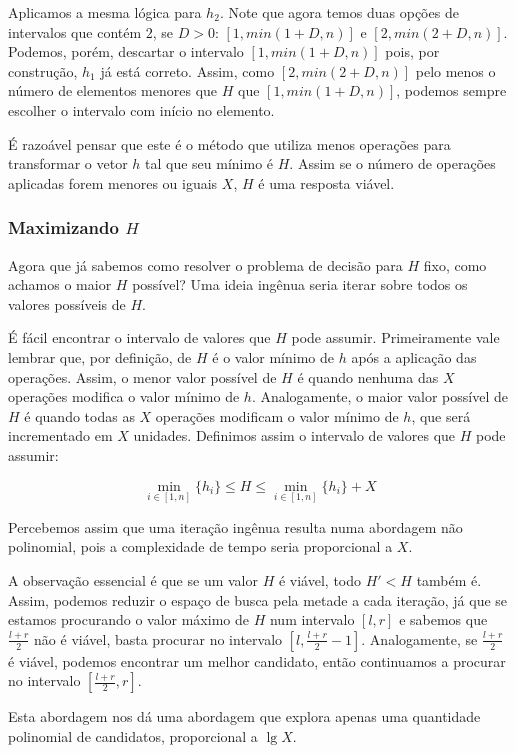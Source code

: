 Aplicamos a mesma lógica para $h_2$. Note que agora temos duas opções de intervalos que contém $2$, se $D > 0$: $[1, min(1 + D, n)]$ e $[2, min(2 + D, n)]$. Podemos, porém, descartar o intervalo $[1, min(1 + D, n)]$ pois, por construção, $h_1$ já está correto. Assim, como $[2, min(2 + D, n)]$ pelo menos o número de elementos menores que $H$ que $[1, min(1 + D, n)]$, podemos sempre escolher o intervalo com início no elemento.

É razoável pensar que este é o método que utiliza menos operações para transformar o vetor $h$ tal que seu mínimo é $H$. Assim se o número de operações aplicadas forem menores ou iguais $X$, $H$ é uma resposta viável.

\subsubsection*{Maximizando $H$}

Agora que já sabemos como resolver o problema de decisão para $H$ fixo, como achamos o maior $H$ possível? Uma ideia ingênua seria iterar sobre todos os valores possíveis de $H$.

É fácil encontrar o intervalo de valores que $H$ pode assumir. Primeiramente vale lembrar que, por definição, de $H$ é o valor mínimo de $h$ após a aplicação das operações. Assim, o menor valor possível de $H$ é quando nenhuma das $X$ operações modifica o valor mínimo de $h$. Analogamente, o maior valor possível de $H$ é quando todas as $X$ operações modificam o valor mínimo de $h$, que será incrementado em $X$ unidades. Definimos assim o intervalo de valores que $H$ pode assumir:


$$\min_{i \in [1, n]}\{h_i\} \leq H \leq \min_{i \in [1, n]}\{h_i\} + X$$

Percebemos assim que uma iteração ingênua resulta numa abordagem não polinomial, pois a complexidade de tempo seria proporcional a $X$.

A observação essencial é que se um valor $H$ é viável, todo $H' < H$ também é. Assim, podemos reduzir o espaço de busca pela metade a cada iteração, já que se estamos procurando o valor máximo de $H$ num intervalo $[l, r]$ e sabemos que $\frac{l + r}{2}$ não é viável, basta procurar no intervalo ${[l, \frac{l + r}{2} - 1]}$. Analogamente, se $\frac{l + r}{2}$ é viável, podemos encontrar um melhor candidato, então continuamos a procurar no intervalo $[\frac{l + r}{2}, r]$.

Esta abordagem nos dá uma abordagem que explora apenas uma quantidade polinomial de candidatos, proporcional a $\lg X$.

